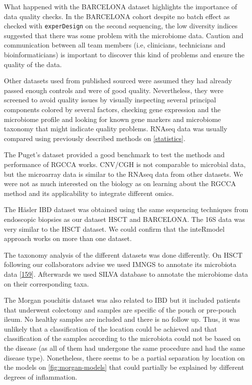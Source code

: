 \documentclass[
  12pt,
  a4paper,
  twoside,
  openright]{book}
\begin{document}
What happened with the BARCELONA dataset highlights the importance of data quality checks.
In the BARCELONA cohort despite no batch effect as checked with \texttt{experDesign} on the second sequencing, the low diversity indices suggested that there was some problem with the microbiome data.
Caution and communication between all team members (i.e, clinicians, technicians and bioinformaticians) is important to discover this kind of problems and ensure the quality of the data.

Other datasets used from published sourced were assumed they had already passed enough controls and were of good quality.
Nevertheless, they were screened to avoid quality issues by visually inspecting several principal components colored by several factors, checking gene expression and the microbiome profile and looking for known gene markers and microbiome taxonomy that might indicate quality problems.
RNAseq data was usually compared using previously described methods on \ref{statistics}.

The Puget's dataset provided a good benchmark to test the methods and performance of RGCCA works.
CNV/CGH is not comparable to microbial data, but the microarray data is similar to the RNAseq data from other datasets.
We were not as much interested on the biology as on learning about the RGCCA method and its applicability to integrate different omics.

The Häsler IBD dataset was obtained using the same sequencing techniques from endoscopic biopsies as our dataset HSCT and BARCELONA.
The 16S data was very similar to the HSCT dataset.
We could confirm that the inteRmodel approach works on more than one dataset.

The taxonomy analysis of the different datasets was done differently.
On HSCT following our collaborators advise we used IMNGS to annotate its microbiota data {[}\protect\hyperlink{ref-lagkouvardos2016}{159}{]}.
Afterwards we used SILVA database to annotate the microbiome data on their corresponding taxa.

The Morgan pouchitis dataset was also related to IBD but it included patients that underwent colectomy and samples are specific of the pouch or pre-pouch ileum.
No healthy samples are included and there is no follow up.
Thus, it was unlikely that a classification of the location could be achieved and that classification of the samples according to the microbiota could not be based on the disease (as all of them had undergone the same procedure and had the same disease type).
Nonetheless, there seems to be a partial separation by location on the models on \ref{fig:morgan-models} that could partially be explained by different degrees of inflammation.
\end{document}
